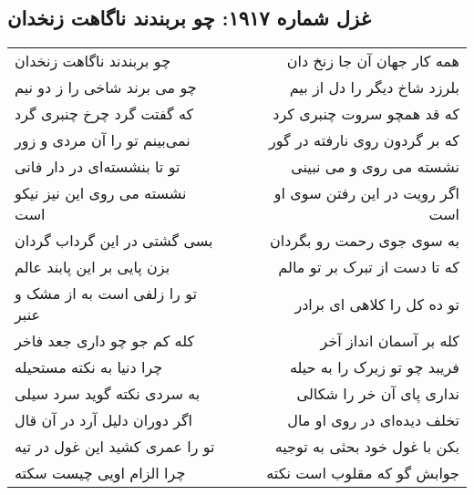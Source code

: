 \begin{center}
\section*{غزل شماره ۱۹۱۷: چو بربندند ناگاهت زنخدان}
\label{sec:1917}
\begin{longtable}{l p{0.5cm} r}
چو بربندند ناگاهت زنخدان
&&
همه کار جهان آن جا زنخ دان
\\
چو می برند شاخی را ز دو نیم
&&
بلرزد شاخ دیگر را دل از بیم
\\
که گفتت گرد چرخ چنبری گرد
&&
که قد همچو سروت چنبری کرد
\\
نمی‌بینم تو را آن مردی و زور
&&
که بر گردون روی نارفته در گور
\\
تو تا بنشسته‌ای در دار فانی
&&
نشسته می روی و می نبینی
\\
نشسته می روی این نیز نیکو است
&&
اگر رویت در این رفتن سوی او است
\\
بسی گشتی در این گرداب گردان
&&
به سوی جوی رحمت رو بگردان
\\
بزن پایی بر این پابند عالم
&&
که تا دست از تبرک بر تو مالم
\\
تو را زلفی است به از مشک و عنبر
&&
تو ده کل را کلاهی ای برادر
\\
کله کم جو چو داری جعد فاخر
&&
کله بر آسمان انداز آخر
\\
چرا دنیا به نکته مستحیله
&&
فریبد چو تو زیرک را به حیله
\\
به سردی نکته گوید سرد سیلی
&&
نداری پای آن خر را شکالی
\\
اگر دوران دلیل آرد در آن قال
&&
تخلف دیده‌ای در روی او مال
\\
تو را عمری کشید این غول در تیه
&&
بکن با غول خود بحثی به توجیه
\\
چرا الزام اویی چیست سکته
&&
جوابش گو که مقلوب است نکته
\\
\end{longtable}
\end{center}
